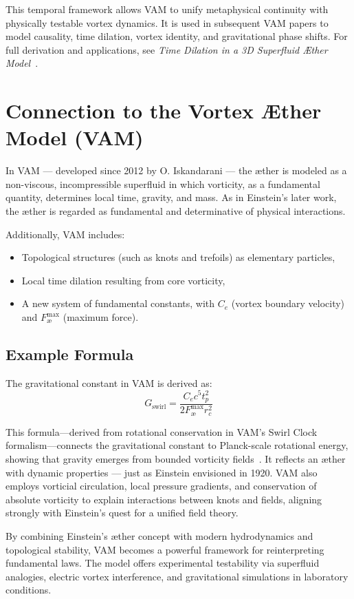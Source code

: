    This temporal framework allows VAM to unify metaphysical continuity with physically testable vortex dynamics. It is used in subsequent VAM papers to model causality, time dilation, vortex identity, and gravitational phase shifts. For full derivation and applications, see \textit{Time Dilation in a 3D Superfluid Æther Model}~\cite{iskandarani2025vam2}.

\section{Connection to the Vortex Æther Model (VAM)}

    In VAM — developed since 2012 by O. Iskandarani — the æther is modeled as a non-viscous, incompressible superfluid in which vorticity, as a fundamental quantity, determines local time, gravity, and mass. As in Einstein's later work, the æther is regarded as fundamental and determinative of physical interactions.

    Additionally, VAM includes:
    \begin{itemize}
        \item Topological structures (such as knots and trefoils) as elementary particles,
        \item Local time dilation resulting from core vorticity,
        \item A new system of fundamental constants, with $C_e$ (vortex boundary velocity) and $F^{\max}_{\text{\ae}}$ (maximum force).
    \end{itemize}

    \subsection*{Example Formula}

    The gravitational constant in VAM is derived as:
    \begin{equation}
        G_\text{swirl} = \frac{C_e c^5 t_p^2}{2 F^{\text{max}}_{\text{\ae}} r_c^2}
    \end{equation}

        This formula—derived from rotational conservation in VAM's Swirl Clock formalism—connects the gravitational constant to Planck-scale rotational energy, showing that gravity emerges from bounded vorticity fields~\cite{iskandarani2025vam2}. It reflects an æther with dynamic properties — just as Einstein envisioned in 1920. VAM also employs vorticial circulation, local pressure gradients, and conservation of absolute vorticity to explain interactions between knots and fields, aligning strongly with Einstein's quest for a unified field theory.

    By combining Einstein's æther concept with modern hydrodynamics and topological stability, VAM becomes a powerful framework for reinterpreting fundamental laws. The model offers experimental testability via superfluid analogies, electric vortex interference, and gravitational simulations in laboratory conditions.